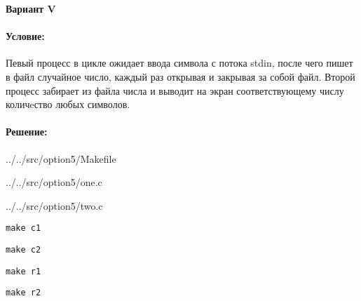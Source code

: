 \begin{center}
    \textbf{Вариант V}
\end{center}

\paragraph{Условие:}

Певый процесс в цикле ожидает ввода символа с потока stdin,
после чего пишет в файл случайное число,
каждый раз открывая и закрывая за собой файл.
Второй процесс забирает из файла числа
и выводит на экран соответствующему числу количeство любых символов.

\paragraph{Решение:} \hspace{0pt}


{../../src/option5/Makefile}


{../../src/option5/one.c}


{../../src/option5/two.c}

\newpage

\noindent\begin{minipage}{.47\textwidth}
    \begin{lstlisting}[name=Tetminal 1,]
make c1
    \end{lstlisting}
\end{minipage}
\hfill
\begin{minipage}{.47\textwidth}
    \begin{lstlisting}[name=Tetminal 2,]
make c2
    \end{lstlisting}
\end{minipage}

\noindent\begin{minipage}{.47\textwidth}
    \begin{lstlisting}[name=Tetminal 1,]
make r1
    \end{lstlisting}
\end{minipage}
\hfill
\begin{minipage}{.47\textwidth}
    \begin{lstlisting}[name=Tetminal 2,]
make r2
    \end{lstlisting}
\end{minipage}

